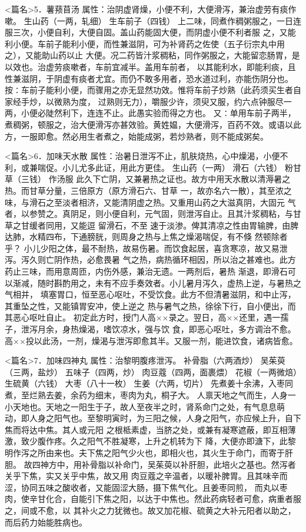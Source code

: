 \documentclass[a4paper,12pt,UTF8,twoside]{ctexbook}
\begin{document}
<篇名>5．薯蓣苜汤
属性：治阴虚肾燥，小便不利，大便滑泻，兼治虚劳有痰作嗽。 
生山药（一两，轧细） 生车前子（四钱） 
上二味，同煮作稠粥服之，一日连服三次，小便自利，大便自固。盖山药能固大便，而阴虚小便不利者服 
之，又能利小便。车前子能利小便，而性兼滋阴，可为补肾药之佐使（五子衍宗丸中用之），又能助山药以止 
大便。况二药皆汁浆稠粘，同作粥服之，大能留恋肠胃，是以效也。治虚劳痰嗽者，车前宜减半。盖用车前者， 
以其能利水，即能利痰，且性兼滋阴，于阴虚有痰者尤宜。而仍不敢多用者，恐水道过利，亦能伤阴分也。 
按∶车前子能利小便，而骤用之亦无显然功效。惟将车前子炒熟（此药须买生者自家经手炒，以微熟为度， 
过熟则无力），嚼服少许，须臾又服，约六点钟服尽一两，小便必陡然利下，连连不止。此愚实验而得之方也。 
又∶单用车前子两半，煮稠粥，顿服之，治大便滑泻亦甚效验。黄姓媪，大便滑泻，百药不效。或语以此 
方，一服即愈。然必用生者煮之，始能成粥，若炒熟者，则不能成粥矣。 


<篇名>6．加味天水散
属性：治暑日泄泻不止，肌肤烧热，心中燥渴，小便不利，或兼喘促。小儿尤多此证，用此方更佳。 
生山药（一两） 滑石（六钱） 粉甘草（三钱） 作汤服 
此久下亡阴，又兼暑热之证也。故方中用天水散以清溽暑之热。而甘草分量，三倍原方（原方滑石六、甘草 
一，故亦名六一散），其至浓之味，与滑石之至淡者相济，又能清阴虚之热。又重用山药之大滋真阴，大固元 
气者，以参赞之。真阴足，则小便自利，元气固，则泄泻自止。且其汁浆稠粘，与甘草之甘缓者同用，又能逗 
留滑石，不至 
速于淡渗。俾其清凉之性由胃输脾，由脾达肺，水精四布，下通膀胱，则周身之热与上焦之燥渴喘促，有不倏 
然顿除者乎？ 
小儿少阳之体，最不耐热，故易伤暑。而饮食起居，喜贪寒凉，故又易泄泻。泻久则亡阴作热，必愈畏暑 
气之热，病热循环相因，所以治之甚难也。此方药止三味，而用意周匝，内伤外感，兼治无遗。一两剂后，暑热 
渐退，即滑石可以渐减，随时斟酌用之，未有不应手奏效者。小儿暑月泻久，虚热上逆，与暑热之气相并， 
填塞胃口，恒至恶心呕吐，不受饮食。此方不但清暑滋阴，和中止泻，其重坠之性，又能镇胃安冲，使上逆之 
热与暑气之热，徐徐下行，自小便出，而其恶心呕吐自止。 
初定此方时，授门人高××录之。翌日，高××还里，遇一孺子，泄泻月余，身热燥渴，嗜饮凉水，强与饮 
食，即恶心呕吐，多方调治不愈。高××投以此汤，一剂，燥渴与泄泻即愈其半。又服一剂，能进饮食，诸病皆愈。 


<篇名>7．加味四神丸
属性：治黎明腹疼泄泻。 
补骨脂（六两酒炒） 吴茱萸（三两，盐炒） 五味子（四两，炒） 肉豆蔻（四两，面裹煨） 
花椒（一两微焙） 生硫黄（六钱） 大枣（八十一枚） 生姜（六两，切片） 
先煮姜十余沸，入枣同煮，至烂熟去姜，余药为细末，枣肉为丸，桐子大。 
人禀天地之气而生，人身一小天地也。天地之一阳生于子，故人至夜半之时，肾系命门之处，有气息息萌 
动，即人身之阳气也。至黎明寅时，为三阳之候，人身之阳气，亦应候上升，自下焦而将达中焦。其人或元阳 
之根柢素虚，当脐之处，或兼有凝寒遮蔽，即互相薄激，致少腹作疼。久之阳气不胜凝寒，上升之机转为下 
降，大便亦即溏下，此黎明作泻之所由来也。夫下焦之阳气少火也，即相火也，其火生于命门，而寄于肝胆。 
故四神方中，用补骨脂以补命门，吴茱萸以补肝胆，此培火之基也。然泻者关乎下焦，实又关乎中焦，故又用 
肉豆蔻之辛温者，以暖补脾胃。且其味辛而涩，协同五味之酸收者，又能固涩大肠，摄下焦气化。且姜枣同煎， 
而丸以枣肉，使辛甘化合，自能引下焦之阳，以达于中焦也。然此药病轻者可愈，病重者服之，间或不愈，以 
其补火之力犹微也。故又加花椒、硫黄之大补元阳者以助之，而后药力始能胜病也。 
\end{document}
